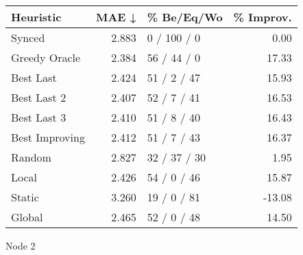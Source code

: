 \begin{tabular}{lrlr}
\toprule
\textbf{Heuristic} & \textbf{MAE ↓} & \textbf{\% Be/Eq/Wo} & \textbf{\% Improv.} \\
\midrule
            Synced &          2.883 &          0 / 100 / 0 &                0.00 \\
     Greedy Oracle &          2.384 &          56 / 44 / 0 &               17.33 \\
         Best Last &          2.424 &          51 / 2 / 47 &               15.93 \\
       Best Last 2 &          2.407 &          52 / 7 / 41 &               16.53 \\
       Best Last 3 &          2.410 &          51 / 8 / 40 &               16.43 \\
    Best Improving &          2.412 &          51 / 7 / 43 &               16.37 \\
            Random &          2.827 &         32 / 37 / 30 &                1.95 \\
             Local &          2.426 &          54 / 0 / 46 &               15.87 \\
            Static &          3.260 &          19 / 0 / 81 &              -13.08 \\
            Global &          2.465 &          52 / 0 / 48 &               14.50 \\
\bottomrule
\end{tabular}
\caption{Node 2}
\label{tab:ds_iid_lr05_le2_bs4_2}

